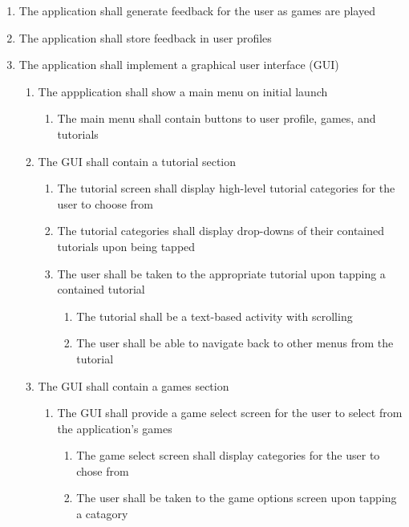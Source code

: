 \documentclass[12pt,letterpaper,oneside]{article}
\begin{document}
\begin{enumerate}
	\item	%
		The application shall generate feedback for the user as games are played

	\item	%
		The application shall store feedback in user profiles

	\item	%
		The application shall implement a graphical user interface (GUI)
		\begin{enumerate}
			\item	%
				The appplication shall show a main menu on initial launch
				\begin{enumerate}
					\item
						The main menu shall contain buttons to user profile, games, and tutorials
				\end{enumerate}
			\item	%
				The GUI shall contain a tutorial section
				\begin{enumerate}
					\item	%
						The tutorial screen shall display high-level tutorial categories for the user to choose from
					\item	%
						The tutorial categories shall display drop-downs of their contained tutorials upon being tapped
					\item	%
						The user shall be taken to the appropriate tutorial upon tapping a contained tutorial
						\begin{enumerate}
							\item
								The tutorial shall be a text-based activity with scrolling
							\item
								The user shall be able to navigate back to other menus from the tutorial
						\end{enumerate}
				\end{enumerate}
			\item
				The GUI shall contain a games section
				\begin{enumerate}
					\item
						The GUI shall provide a game select screen for the user to select from the application's games
						\begin{enumerate}
							\item
								The game select screen shall display categories for the user to chose from
							\item
								The user shall be taken to the game options screen upon tapping a catagory

\end{enumerate}
\end{enumerate}
\end{enumerate}
\end{enumerate}
\end{document}
